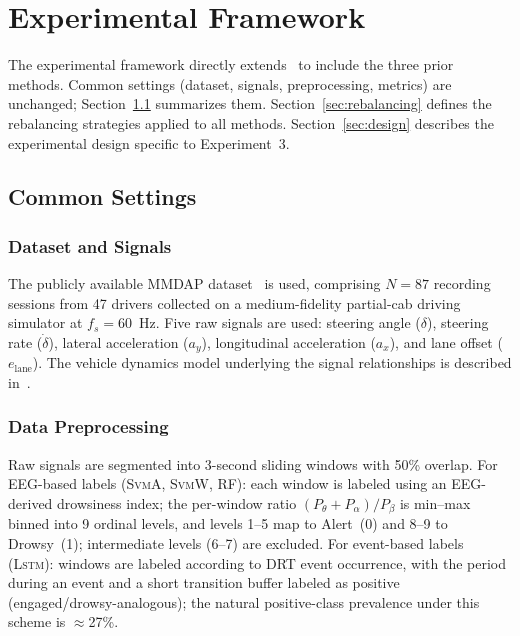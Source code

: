 \documentclass[lettersize,journal]{IEEEtran}
\newcommand{\Impl}[1]{\textsc{#1}}
\begin{document}
\section{Experimental Framework}
\label{sec:framework}

The experimental framework directly extends~\cite{nakagama2026tiv} to include the three prior methods.
Common settings (dataset, signals, preprocessing, metrics) are unchanged; Section~\ref{sec:common_settings} summarizes them.
Section~\ref{sec:rebalancing} defines the rebalancing strategies applied to all methods.
Section~\ref{sec:design} describes the experimental design specific to Experiment~3.

\subsection{Common Settings}
\label{sec:common_settings}

\subsubsection{Dataset and Signals}
The publicly available MMDAP dataset~\cite{aygun2024} is used, comprising $N = 87$ recording sessions from 47 drivers collected on a medium-fidelity partial-cab driving simulator at $f_s = 60$~Hz.
Five raw signals are used: steering angle ($\delta$), steering rate ($\dot{\delta}$), lateral acceleration ($a_y$), longitudinal acceleration ($a_x$), and lane offset ($e_{\text{lane}}$).
The vehicle dynamics model underlying the signal relationships is described in~\cite{nakagama2026tiv}.

\subsubsection{Data Preprocessing}
\label{sec:preprocessing}
Raw signals are segmented into 3-second sliding windows with 50\% overlap.
For EEG-based labels (\Impl{SvmA}, \Impl{SvmW}, RF): each window is labeled using an EEG-derived drowsiness index; the per-window ratio $(P_\theta + P_\alpha)/P_\beta$ is min--max binned into 9 ordinal levels, and levels 1--5 map to Alert~(0) and 8--9 to Drowsy~(1); intermediate levels (6--7) are excluded.
For event-based labels (\Impl{Lstm}): windows are labeled according to DRT event occurrence, with the period during an event and a short transition buffer labeled as positive (engaged/drowsy-analogous); the natural positive-class prevalence under this scheme is $\approx$27\%.
\end{document}
